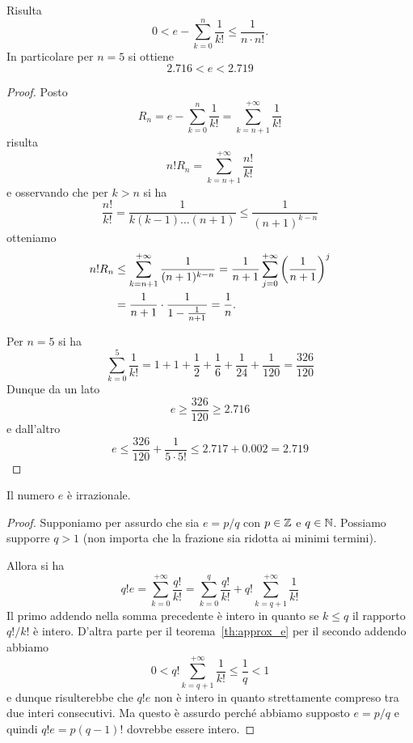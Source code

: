 \begin{theorem}[approssimazione di $e$]
\label{th:approx_e}%
%
%
Risulta
\[
   0 < e - \sum_{k=0}^n \frac{1}{k!} \le \frac{1}{n \cdot n!}.
\]
In particolare per $n=5$ si ottiene
\[
  2.716 < e < 2.719
\]
\end{theorem}
%
\begin{proof}
Posto
\[
  R_n = e - \sum_{k=0}^n \frac{1}{k!} = \sum_{k=n+1}^{+\infty} \frac{1}{k!}
\]
risulta
\[
  n! R_n = \sum_{k=n+1}^{+\infty} \frac{n!}{k!}
\]
e osservando che per $k>n$ si ha
\[
\frac{n!}{k!} = \frac{1}{k (k-1) \dots (n+1)} \le \frac{1}{(n+1)^{k-n}}
\]
otteniamo
\begin{align*}
 n! R_n  & \le \sum_{k=n+1}^{+\infty}\frac{1}{(n+1)^{k-n}}
 = \frac 1 {n+1} \sum_{j=0}^{+\infty} {\left( \frac{1}{n+1} \right)}^j \\
 &= \frac 1 {n+1} \cdot \frac{1}{1-\frac{1}{n+1}} = \frac 1 n.
\end{align*}

Per $n=5$ si ha
\[
 \sum_{k=0}^5 \frac{1}{k!} = 1 + 1 + \frac 1 2 + \frac{1}{6} + \frac {1}{24} + \frac{1}{120}
 = \frac{326}{120}
\]
Dunque da un lato
\[
  e \ge \frac{326}{120} \ge 2.716
\]
e dall'altro
\[
 e \le \frac{326}{120} + \frac{1}{5\cdot 5!}
   \le 2.717 + 0.002 = 2.719
\]
\end{proof}

\begin{theorem}[irrazionalità di $e$]
%
\mymark{**}%
%
%
Il numero $e$ è irrazionale.
\end{theorem}
%
\begin{proof}
Supponiamo per assurdo che sia $e=p/q$ con $p\in \mathbb Z$ e $q \in \mathbb N$.
Possiamo supporre $q>1$
(non importa che la frazione sia ridotta ai minimi termini).

Allora si ha
\[
  q! e = \sum_{k=0}^{+\infty} \frac{q!}{k!}
   = \sum_{k=0}^q \frac{q!}{k!} + q!\sum_{k=q+1}^{+\infty} \frac{1}{k!}
\]
Il primo addendo nella somma precedente è intero
in quanto se $k\le q$ il rapporto $q!/k!$ è intero.
D'altra parte per il teorema~\ref{th:approx_e}
per il secondo addendo abbiamo
\[
0 < q! \sum_{k=q+1}^{+\infty} \frac{1}{k!}
\le \frac{1}{q} < 1
\]
e dunque risulterebbe che $q! e$ non è intero in quanto strettamente compreso
tra due interi consecutivi. Ma questo è assurdo perché abbiamo supposto
$e=p/q$ e quindi $q! e = p(q-1)!$ dovrebbe essere intero.
\end{proof}


